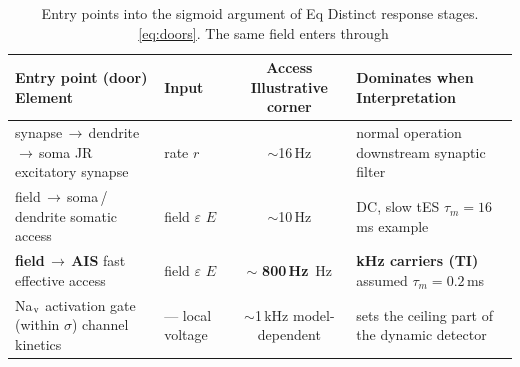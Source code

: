 \documentclass[11pt,a4paper]{article}
\newcommand{\Sig}{\sigma}
\providecommand{\DIFaddtex}[1]{{\protect\color{blue} \sf #1}} %
\providecommand{\DIFdeltex}[1]{{\protect\color{red} \scriptsize #1}} %
\providecommand{\DIFaddFL}[1]{\DIFadd{#1}} %
\providecommand{\DIFdelFL}[1]{\DIFdel{#1}} %
\providecommand{\DIFaddbeginFL}{} %
\providecommand{\DIFaddendFL}{} %
\providecommand{\DIFdelbeginFL}{} %
\providecommand{\DIFdelendFL}{} %
\providecommand{\DIFadd}[1]{\texorpdfstring{\DIFaddtex{#1}}{#1}} %
\providecommand{\DIFdel}[1]{\texorpdfstring{\DIFdeltex{#1}}{}} %
\begin{document}
\begin{table}[h]
\centering\small
\renewcommand{\arraystretch}{1.15}
\begin{tabular}{@{}p{4.3cm} l c p{3.3cm}@{}}
\toprule
\DIFdelbeginFL \DIFdelFL{Entry point (door) }\DIFdelendFL \DIFaddbeginFL \DIFaddFL{Element }\DIFaddendFL & Input & \DIFdelbeginFL \DIFdelFL{Access }\DIFdelendFL \DIFaddbeginFL \DIFaddFL{Illustrative }\DIFaddendFL corner & \DIFdelbeginFL \DIFdelFL{Dominates when }\DIFdelendFL \DIFaddbeginFL \DIFaddFL{Interpretation }\DIFaddendFL \\
\midrule
\DIFdelbeginFL \DIFdelFL{synapse\,$\to$\,dendrite\,$\to$\,soma }\DIFdelendFL \DIFaddbeginFL \DIFaddFL{JR excitatory synapse }\DIFaddendFL & rate $r$ & $\sim$16\,Hz & \DIFdelbeginFL \DIFdelFL{normal operation }\DIFdelendFL \DIFaddbeginFL \DIFaddFL{downstream synaptic filter }\DIFaddendFL \\
\DIFdelbeginFL \DIFdelFL{field\,$\to$\,soma\,/\,dendrite }\DIFdelendFL \DIFaddbeginFL \DIFaddFL{somatic access }\DIFaddendFL & field \DIFdelbeginFL \DIFdelFL{$\varepsilon$ }\DIFdelendFL \DIFaddbeginFL \DIFaddFL{$E$ }\DIFaddendFL & $\sim$10\,Hz & \DIFdelbeginFL \DIFdelFL{DC, slow tES }\DIFdelendFL \DIFaddbeginFL \DIFaddFL{$\tau_m=16$\,ms example }\DIFaddendFL \\
\DIFdelbeginFL \DIFdelFL{\textbf{field\,$\to$\,AIS} }\DIFdelendFL \DIFaddbeginFL \DIFaddFL{fast effective access }\DIFaddendFL & field \DIFdelbeginFL \DIFdelFL{$\varepsilon$ }\DIFdelendFL \DIFaddbeginFL \DIFaddFL{$E$ }\DIFaddendFL & $\sim$\DIFdelbeginFL \DIFdelFL{\textbf{800\,Hz} }\DIFdelendFL \DIFaddbeginFL \DIFaddFL{800\,Hz }\DIFaddendFL & \DIFdelbeginFL \DIFdelFL{\textbf{kHz carriers (TI)} }\DIFdelendFL \DIFaddbeginFL \DIFaddFL{assumed $\tau_m=0.2$\,ms }\DIFaddendFL \\
\DIFdelbeginFL \DIFdelFL{Na$_{\rm v}$ activation gate (within $\Sig$) }\DIFdelendFL \DIFaddbeginFL \DIFaddFL{channel kinetics }\DIFaddendFL & \DIFdelbeginFL \DIFdelFL{--- }\DIFdelendFL \DIFaddbeginFL \DIFaddFL{local voltage }\DIFaddendFL & \DIFdelbeginFL \DIFdelFL{$\sim$1\,kHz }\DIFdelendFL \DIFaddbeginFL \DIFaddFL{model-dependent }\DIFaddendFL & \DIFdelbeginFL \DIFdelFL{sets the ceiling }\DIFdelendFL \DIFaddbeginFL \DIFaddFL{part of the dynamic detector }\DIFaddendFL \\
\bottomrule
\end{tabular}
\caption{\DIFdelbeginFL \DIFdelFL{Entry points into the sigmoid argument of Eq}\DIFdelendFL \DIFaddbeginFL \DIFaddFL{Distinct response stages}\DIFaddendFL . \DIFdelbeginFL \DIFdelFL{~\eqref{eq:doors}. }\DIFdelendFL The \DIFdelbeginFL \DIFdelFL{same field enters through
}}
\end{table}
\end{document}
